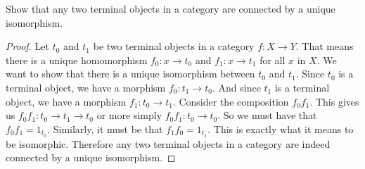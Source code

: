 \documentclass[main.tex]{subfiles}
\begin{document}
\begin{exercise}
	Show that any two terminal objects in a category are connected by a unique
	isomorphism.
\end{exercise}

\begin{proof}
Let $t_0$ and $t_1$ be two terminal objects in a category $f\colon X \rightarrow Y$.
That means there is a unique homomorphism $f_0\colon x \rightarrow t_0$ and $f_1\colon x
\rightarrow t_1$ for all $x$ in $X$. We want to show that there is a unique
isomorphism between $t_0$ and $t_1$.
Since $t_0$ is a terminal object, we have a morphism $f_0\colon t_1 \rightarrow t_0$.
And since $t_1$ is a terminal object, we have a morphism $f_1\colon t_0 \rightarrow
t_1$. Consider the composition $f_0 f_1$. This gives us $f_0 f_1\colon t_0
\rightarrow t_1 \rightarrow t_0$ or more simply $f_0 f_1\colon t_0 \rightarrow t_0$.
So we must have that $f_0 f_1 = 1_{t_0}$. Similarly, it must be that $f_1 f_0 =
1_{t_1}$. This is exactly what it means to be isomorphic.
Therefore any two terminal objects in a category are indeed connected by a
unique isomorphism.
\end{proof}
\end{document}
